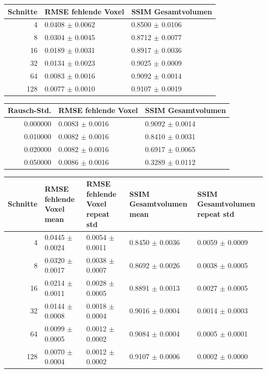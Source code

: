 \begin{tabular}{rll}
\toprule
Schnitte & RMSE fehlende Voxel & SSIM Gesamtvolumen \\
\midrule
4 & 0.0408 $\pm$ 0.0062 & 0.8500 $\pm$ 0.0106 \\
8 & 0.0304 $\pm$ 0.0045 & 0.8712 $\pm$ 0.0077 \\
16 & 0.0189 $\pm$ 0.0031 & 0.8917 $\pm$ 0.0036 \\
32 & 0.0134 $\pm$ 0.0023 & 0.9025 $\pm$ 0.0009 \\
64 & 0.0083 $\pm$ 0.0016 & 0.9092 $\pm$ 0.0014 \\
128 & 0.0077 $\pm$ 0.0010 & 0.9107 $\pm$ 0.0019 \\
\bottomrule
\end{tabular}


\begin{tabular}{rll}
\toprule
Rausch-Std. & RMSE fehlende Voxel & SSIM Gesamtvolumen \\
\midrule
0.000000 & 0.0083 $\pm$ 0.0016 & 0.9092 $\pm$ 0.0014 \\
0.010000 & 0.0082 $\pm$ 0.0016 & 0.8410 $\pm$ 0.0031 \\
0.020000 & 0.0082 $\pm$ 0.0016 & 0.6917 $\pm$ 0.0065 \\
0.050000 & 0.0086 $\pm$ 0.0016 & 0.3289 $\pm$ 0.0112 \\
\bottomrule
\end{tabular}


\begin{tabular}{rllll}
\toprule
Schnitte & RMSE fehlende Voxel mean & RMSE fehlende Voxel repeat std & SSIM Gesamtvolumen mean & SSIM Gesamtvolumen repeat std \\
\midrule
4 & 0.0445 $\pm$ 0.0024 & 0.0054 $\pm$ 0.0011 & 0.8450 $\pm$ 0.0036 & 0.0059 $\pm$ 0.0009 \\
8 & 0.0320 $\pm$ 0.0017 & 0.0038 $\pm$ 0.0007 & 0.8692 $\pm$ 0.0026 & 0.0038 $\pm$ 0.0005 \\
16 & 0.0214 $\pm$ 0.0011 & 0.0028 $\pm$ 0.0005 & 0.8891 $\pm$ 0.0013 & 0.0027 $\pm$ 0.0005 \\
32 & 0.0144 $\pm$ 0.0008 & 0.0018 $\pm$ 0.0004 & 0.9016 $\pm$ 0.0004 & 0.0014 $\pm$ 0.0003 \\
64 & 0.0099 $\pm$ 0.0005 & 0.0012 $\pm$ 0.0002 & 0.9084 $\pm$ 0.0004 & 0.0005 $\pm$ 0.0001 \\
128 & 0.0070 $\pm$ 0.0004 & 0.0012 $\pm$ 0.0002 & 0.9107 $\pm$ 0.0006 & 0.0002 $\pm$ 0.0000 \\
\bottomrule
\end{tabular}


